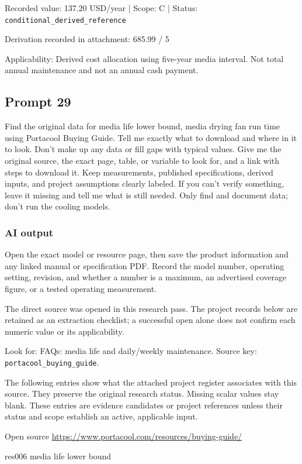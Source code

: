 Recorded value: 137.20 USD/year | Scope: C | Status: \nolinkurl{conditional_derived_reference}

Derivation recorded in attachment: 685.99 / 5

Applicability: Derived cost allocation using five-year media interval. Not total annual maintenance and not an annual cash payment.

\subsection*{Prompt 29}
Find the original data for media life lower bound, media drying fan run time using Portacool Buying Guide. Tell me exactly what to download and where in it to look. Don’t make up any data or fill gaps with typical values. Give me the original source, the exact page, table, or variable to look for, and a link with steps to download it. Keep measurements, published specifications, derived inputs, and project assumptions clearly labeled. If you can’t verify something, leave it missing and tell me what is still needed. Only find and document data; don’t run the cooling models.

\subsubsection*{AI output}
Open the exact model or resource page, then save the product information and any linked manual or specification PDF. Record the model number, operating setting, revision, and whether a number is a maximum, an advertised coverage figure, or a tested operating measurement.

The direct source was opened in this research pass. The project records below are retained as an extraction checklist; a successful open alone does not confirm each numeric value or its applicability.

Look for: FAQs: media life and daily/weekly maintenance. Source key: \nolinkurl{portacool_buying_guide}.

The following entries show what the attached project register associates with this source. They preserve the original research status. Missing scalar values stay blank. These entries are evidence candidates or project references unless their status and scope establish an active, applicable input.

Open source  \url{https://www.portacool.com/resources/buying-guide/}

res006  media life lower bound

